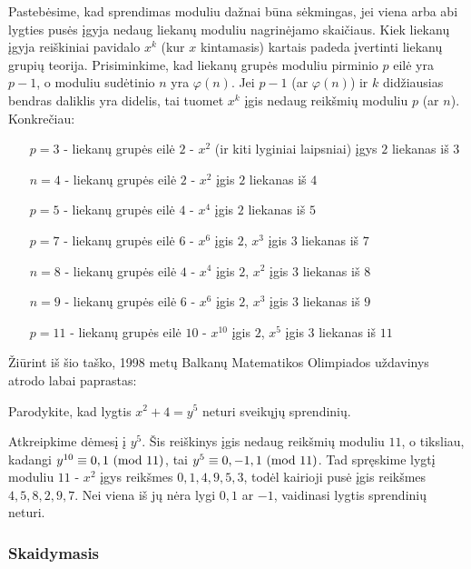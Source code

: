 Pastebėsime, kad sprendimas moduliu dažnai būna sėkmingas, jei viena arba
abi lygties pusės įgyja nedaug liekanų moduliu nagrinėjamo skaičiaus. Kiek
liekanų įgyja reiškiniai pavidalo $x^k$ (kur $x$ kintamasis) kartais padeda
įvertinti liekanų grupių teorija. Prisiminkime, kad liekanų grupės moduliu
pirminio $p$ eilė yra $p-1$, o moduliu sudėtinio $n$ yra $\varphi(n)$. Jei
$p-1$ (ar $\varphi(n)$) ir $k$ didžiausias bendras daliklis yra didelis, tai
tuomet $x^k$ įgis nedaug reikšmių moduliu $p$ (ar $n$). Konkrečiau:

\begin{itemize}
  \item[$p=3$ -] liekanų grupės eilė $2$ - $x^2$ (ir kiti lyginiai
    laipsniai) įgys $2$ liekanas iš $3$ 
  \item[$n=4$ -] liekanų grupės eilė $2$ - $x^2$ įgis $2$ liekanas iš $4$
  \item[$p=5$ -] liekanų grupės eilė $4$ - $x^4$ įgis $2$ liekanas iš $5$
  \item[$p=7$ -] liekanų grupės eilė $6$ - $x^6$ įgis $2$, $x^3$ įgis $3$ liekanas iš $7$
  \item[$n=8$ -] liekanų grupės eilė $4$ - $x^4$ įgis $2$, $x^2$ įgis $3$ liekanas iš $8$
  \item[$n=9$ -] liekanų grupės eilė $6$ - $x^6$ įgis $2$, $x^3$ įgis $3$ liekanas iš $9$
  \item[$p=11$ -] liekanų grupės eilė $10$ - $x^{10}$ įgis $2$, $x^5$ įgis $3$ liekanas iš $11$
\end{itemize}

Žiūrint iš šio taško, 1998 metų Balkanų Matematikos Olimpiados uždavinys
atrodo labai paprastas:
\begin{pav} \text{\emph{[BMO 1998]}} Parodykite, kad lygtis $x^2 + 4 = y^5$ neturi
  sveikųjų sprendinių.
\end{pav}

\begin{sprendimas}
  Atkreipkime dėmesį į $y^5$. Šis reiškinys įgis nedaug reikšmių moduliu
  $11$, o tiksliau, kadangi $y^{10} \equiv 0,1 \ (\text{mod } 11)$, tai $y^5 \equiv 0,
  -1, 1 \ (\text{mod } 11)$. Tad spręskime lygtį moduliu $11$ - $x^2$ įgys reikšmes
  $0, 1, 4, 9, 5, 3$, todėl kairioji pusė įgis reikšmes $4, 5, 8, 2, 9, 7$.
  Nei viena iš jų nėra lygi $0, 1$ ar $-1$, vaidinasi lygtis sprendinių
  neturi.
\end{sprendimas}

\subsubsection{Skaidymasis}

